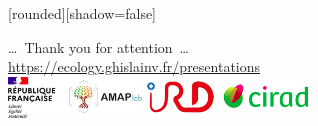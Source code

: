 \documentclass[10pt,table,dvipsnames,compress]{beamer}
\begin{document}
{
  [rounded][shadow=false]
  \begin{frame}[plain]
    \begin{block}{}
      \begin{center}
        \ldots~Thank you for attention~\ldots \\
        \url{https://ecology.ghislainv.fr/presentations} \\
        \includegraphics[width=0.6\textwidth]{figs/partners_logos}
      \end{center}
    \end{block}
  \end{frame}
}
\end{document}
